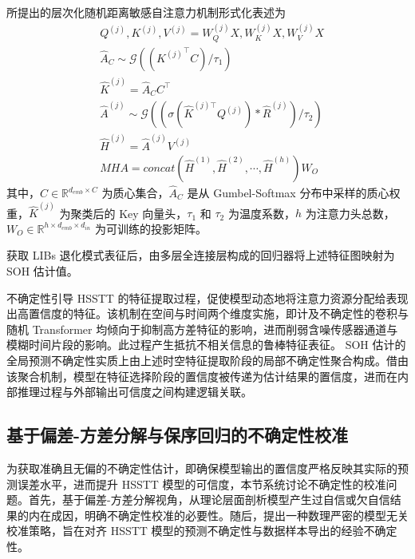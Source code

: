 所提出的层次化随机距离敏感自注意力机制形式化表述为
\begin{align}
\label{eq:attention_kqv} & Q^{(j)}, K^{(j)}, V^{(j)} = W_{Q}^{(j)}X, W_{K}^{(j)}X, W_{V}^{(j)}X \\
\label{eq:hsstt_k} & \hat{A}_{C} \sim \mathcal{G}(({K^{(j)}}^\top C) / \tau_{1}) \\
\label{eq:hsstt_clustered_k} & \hat{K}^{(j)} = \hat{A}_{C}C^\top \\
\label{eq:hsstt_hierarchical_attention} & \hat{A}^{(j)} \sim \mathcal{G}((\sigma(\hat{K}^{(j)\top} Q^{(j)})*\hat{R}^{(j)}) / \tau_{2}) \\
\label{eq:hsstt} & \hat{H}^{({j})}=\hat{A}^{({j})}V^{{(j)}} \\
\label{eq:hsstt_mha} & \widehat{MHA}=concat(\hat{H}^{(1)},\hat{H}^{(2)},\cdots,\hat{H}^{(h)})W_{O}
\end{align}
%
其中，$C \in \mathbb{R}^{d_{emb} \times C}$ 为质心集合，$\hat{A}_C$ 是从 Gumbel-Softmax 分布中采样的质心权重，$\hat{K}^{(j)}$ 为聚类后的 Key 向量头，$\tau_1$ 和 $\tau_2$ 为温度系数，$h$ 为注意力头总数，$W_O \in \mathbb{R}^{h \times d_{emb} \times d_{in}}$ 为可训练的投影矩阵。

获取 LIBs 退化模式表征后，由多层全连接层构成的回归器将上述特征图映射为 SOH 估计值。

不确定性引导 HSSTT 的特征提取过程，促使模型动态地将注意力资源分配给表现出高置信度的特征。该机制在空间与时间两个维度实施，即计及不确定性的卷积与随机 Transformer 均倾向于抑制高方差特征的影响，进而削弱含噪传感器通道与模糊时间片段的影响。此过程产生抵抗不相关信息的鲁棒特征表征。
% 
SOH 估计的全局预测不确定性实质上由上述时空特征提取阶段的局部不确定性聚合构成。借由该聚合机制，模型在特征选择阶段的置信度被传递为估计结果的置信度，进而在内部推理过程与外部输出可信度之间构建逻辑关联。

\subsection{基于偏差-方差分解与保序回归的不确定性校准}\label{subsec:uncertainty_calibration}

为获取准确且无偏的不确定性估计，即确保模型输出的置信度严格反映其实际的预测误差水平，进而提升 HSSTT 模型的可信度，本节系统讨论不确定性的校准问题。首先，基于偏差-方差分解视角，从理论层面剖析模型产生过自信或欠自信结果的内在成因，明确不确定性校准的必要性。随后，提出一种数理严密的模型无关校准策略，旨在对齐 HSSTT 模型的预测不确定性与数据样本导出的经验不确定性。

